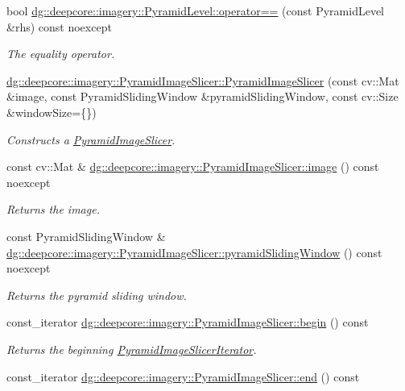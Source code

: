 \begin{DoxyCompactItemize}
bool \hyperlink{group___imagery_module_ga4195fc5c6eb71435e4aa06165bbb6f36}{dg\+::deepcore\+::imagery\+::\+Pyramid\+Level\+::operator==} (const Pyramid\+Level \&rhs) const noexcept
\begin{DoxyCompactList}\small\item\em The equality operator. \end{DoxyCompactList}\item 
\hyperlink{group___imagery_module_gaaebf1aa82f6ff98fd3eb8c65544c7ce1}{dg\+::deepcore\+::imagery\+::\+Pyramid\+Image\+Slicer\+::\+Pyramid\+Image\+Slicer} (const cv\+::\+Mat \&image, const Pyramid\+Sliding\+Window \&pyramid\+Sliding\+Window, const cv\+::\+Size \&window\+Size=\{\})
\begin{DoxyCompactList}\small\item\em Constructs a \hyperlink{classdg_1_1deepcore_1_1imagery_1_1_pyramid_image_slicer}{Pyramid\+Image\+Slicer}. \end{DoxyCompactList}\item 
const cv\+::\+Mat \& \hyperlink{group___imagery_module_ga90b67bc2fa06b73b89d73c8216931bc9}{dg\+::deepcore\+::imagery\+::\+Pyramid\+Image\+Slicer\+::image} () const noexcept
\begin{DoxyCompactList}\small\item\em Returns the image. \end{DoxyCompactList}\item 
const Pyramid\+Sliding\+Window \& \hyperlink{group___imagery_module_ga7558b54bb237cddcf03b4442471c06ef}{dg\+::deepcore\+::imagery\+::\+Pyramid\+Image\+Slicer\+::pyramid\+Sliding\+Window} () const noexcept
\begin{DoxyCompactList}\small\item\em Returns the pyramid sliding window. \end{DoxyCompactList}\item 
const\+\_\+iterator \hyperlink{group___imagery_module_gac100b1de973af8ac0c9a5e1c3dc8d755}{dg\+::deepcore\+::imagery\+::\+Pyramid\+Image\+Slicer\+::begin} () const 
\begin{DoxyCompactList}\small\item\em Returns the beginning \hyperlink{classdg_1_1deepcore_1_1imagery_1_1_pyramid_image_slicer_iterator}{Pyramid\+Image\+Slicer\+Iterator}. \end{DoxyCompactList}\item 
const\+\_\+iterator \hyperlink{group___imagery_module_ga6956abd01339df9e8c60963702ce3543}{dg\+::deepcore\+::imagery\+::\+Pyramid\+Image\+Slicer\+::end} () const 

\end{DoxyCompactItemize}
